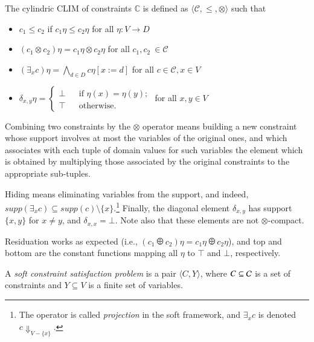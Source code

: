 \documentclass[main.tex]{subfiles}
\begin{document}
\begin{proposition}\label{prop:soft}
  The cylindric CLIM of constraints $\mathbb C$ is
  defined as $\langle {\mathcal C}, \leq, \otimes\rangle$ such that

  \begin{itemize}
  \item $c_1 \leq c_2$ if $c_1\eta\leq c_2\eta$ for all $\eta: V \rightarrow D$
  \item $(c_1\otimes c_2)\eta = c_1\eta\otimes c_2\eta$ for all $c_1, c_2\ \in {\mathcal C}$
  \item  $(\exists_x c) \eta = \bigwedge_{d \in D} c \eta [x:=d]$ for all $c \in {\mathcal C}, x \in V$
 \item $\delta_{x,y}\eta = \left\{
 \begin{array}{rcl} \bot & & \text{if } \eta(x) = \eta(y); \\
 \top & & \text{otherwise.}
 \end{array} \right.$ for all $x, y \in V$
  \end{itemize}
\end{proposition}

Combining two constraints by the $\otimes$ operator
means building a new constraint whose support involves at most
the variables of the original ones, and which associates with
each tuple of domain values for such variables the element
which is obtained by multiplying  those associated by the
original constraints to the appropriate sub-tuples.

Hiding means eliminating variables from the support, and indeed,
$supp(\exists_x c) \subseteq supp({c}) \setminus \{x\}$.\footnote{The operator
is called \emph{projection} in the soft framework,
and $\exists_x c$ is denoted $c\Downarrow_{V-\{x\}}$.}
%
Finally, the diagonal element $\delta_{x,y}$ has support $\{x, y\}$ for 
$x \neq y$, and $\delta_{x,x} = \bot$. Note also that these elements are not 
$\otimes$-compact.

Residuation works as expected (i.e., $(c_1\odiv c_2)\eta = c_1\eta\odiv c_2\eta$),
and top and bottom are the constant functions mapping all $\eta$ to $\top$ and $\bot$,
respectively.

\begin{definition}
  A \emph{soft constraint satisfaction problem} is a pair $\langle C,
  Y \rangle$, where $C \subseteq {\cal C}$ is a set of constraints and
  $Y \subseteq V$ is a finite set of variables.
\end{definition}
\end{document}
